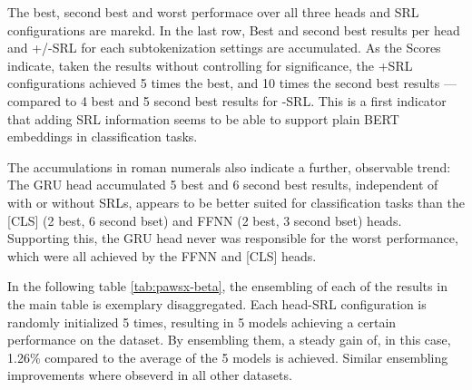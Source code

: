 The best, second best and worst performace over all three heads and SRL configurations
are marekd. In the last row, Best and second best results per head and +/-SRL for each
subtokenization settings are accumulated. As the Scores indicate, taken the results without
controlling for significance, the +SRL configurations
achieved 5 times the best, and 10 times the second best results --- compared to 4 best and
5 second best results for -SRL. This is a first indicator that adding SRL information seems
to be able to support plain BERT embeddings in classification tasks.

The accumulations in roman numerals also indicate a further, observable trend: The GRU head
accumulated 5 best and 6 second best results, independent of with or without SRLs, appears to be better
suited for classification tasks than the [CLS] (2 best, 6 second bset) and FFNN (2 best, 3 second bset) heads.
Supporting this, the GRU head never was responsible for the worst performance, which were all
achieved by the FFNN and [CLS] heads.

In the following table \ref{tab:pawsx-beta}, the ensembling of each of the results in the main table is
exemplary disaggregated. Each head-SRL configuration is randomly initialized 5 times, resulting in
5 models achieving a certain performance on the dataset. By ensembling them, a steady gain of, in this case,
1.26\% compared to the average of the 5 models is achieved. Similar ensembling improvements where
obseverd in all other datasets.


